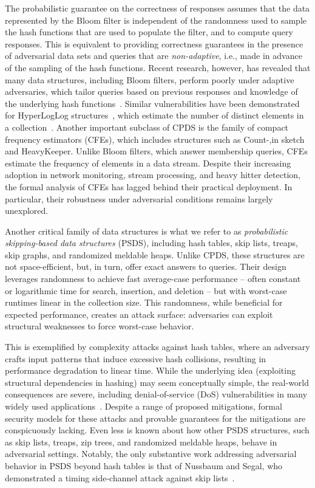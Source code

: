 The probabilistic guarantee on the correctness of responses assumes that the data represented by the Bloom filter is independent of the randomness used to sample the hash functions that are used to populate the filter, and to compute query responses.  This is equivalent to providing correctness guarantees in the presence of adversarial data sets and queries that are \emph{non-adaptive}, i.e., made in advance of the sampling of the hash functions.  Recent research, however, has revealed that many data structures, including Bloom filters, perform poorly under adaptive adversaries, which tailor queries based on previous responses and knowledge of the underlying hash functions~\cite{naor2015bloom,clayton2019,CCS:FPUV22,filic2025deletions}. Similar vulnerabilities have been demonstrated for HyperLogLog structures~\cite{paterson2021}, which estimate the number of distinct elements in a collection~\cite{flajolet2007hyperloglog}. Another important subclass of CPDS is the family of compact frequency estimators (CFEs), which includes structures such as Count-,in sketch and HeavyKeeper. Unlike Bloom filters, which answer membership queries, CFEs estimate the frequency of elements in a data stream. Despite their increasing adoption in network monitoring, stream processing, and heavy hitter detection, the formal analysis of CFEs has lagged behind their practical deployment. In particular, their robustness under adversarial conditions remains largely unexplored.

Another critical family of data structures is what we refer to as \emph{probabilistic skipping-based data structures} (PSDS), including  hash tables, skip lists, treaps, skip graphs, and randomized meldable heaps. Unlike CPDS, these structures are not space-efficient, but, in turn, offer exact answers to queries. Their design leverages randomness to achieve fast average-case performance -- often constant or logarithmic time for search, insertion, and deletion -- but with worst-case runtimes linear in the collection size. This randomness, while beneficial for expected performance, creates an attack surface: adversaries can exploit structural weaknesses to force worst-case behavior.

This is exemplified by complexity attacks against hash tables, where an adversary crafts input patterns that induce excessive hash collisions, resulting in performance degradation to linear time. While the underlying idea (exploiting structural dependencies in hashing) may seem conceptually simple, the real-world consequences are severe, including denial-of-service (DoS) vulnerabilities in many widely used applications~\cite{CrosbyW03,klink2011efficient,aumasson2012hash,rosen2014netfilter,bottinelli2025hash}. Despite a range of proposed mitigations, formal security models for these attacks and provable guarantees for the mitigations are conspicuously lacking. Even less is known about how other PSDS structures, such as skip lists, treaps, zip trees, and randomized meldable heaps, behave in adversarial settings. Notably, the only substantive work addressing adversarial behavior in PSDS beyond hash tables is that of Nussbaum and Segal, who demonstrated a timing side-channel attack against skip lists~\cite{nussbaum2019skiplist}.

